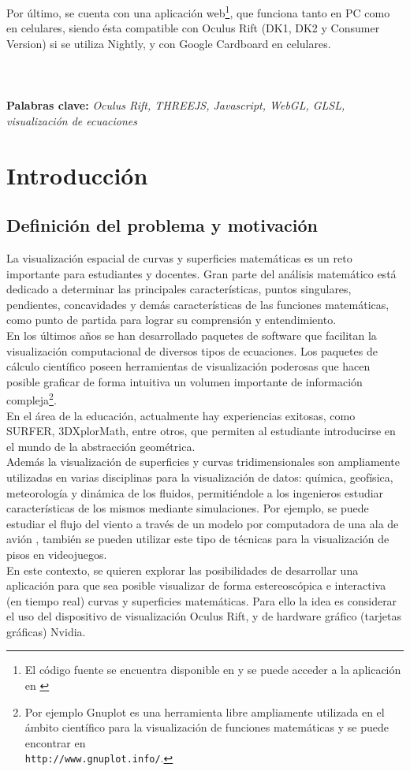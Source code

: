 \documentclass[12pt]{article}
\begin{document}
Por último, se cuenta con una aplicación web\footnote{El código fuente se encuentra disponible en \cite{nuestrocodigo} y se puede acceder a la aplicación en \cite{nuestrositio}}, que funciona  tanto en PC como en celulares, siendo ésta compatible con Oculus Rift (DK1, DK2 y Consumer Version) si se utiliza Nightly, y con Google Cardboard en celulares.
\\
\\
\\
\\
\textbf{Palabras clave:} \textit{Oculus Rift, THREEJS, Javascript, WebGL, GLSL, visualización de ecuaciones} 


\clearpage
\tableofcontents
\clearpage
\section{Introducción}

\subsection{Definición del problema y motivación}
La visualización espacial de curvas y superficies matemáticas es un reto importante para estudiantes y docentes. Gran parte del análisis matemático está dedicado a determinar las principales características, puntos singulares, pendientes, concavidades y demás características de las  funciones matemáticas, como punto de partida para lograr su comprensión y entendimiento.
\\En los últimos años se han desarrollado paquetes de software que facilitan la visualización computacional de diversos tipos de ecuaciones. Los paquetes de cálculo científico poseen herramientas de visualización poderosas que hacen posible graficar de forma intuitiva un volumen importante de información compleja\footnote{Por ejemplo Gnuplot es una herramienta libre ampliamente utilizada en el ámbito científico para la visualización de funciones matemáticas y se puede encontrar en \\\texttt{http://www.gnuplot.info/}\cite{gnuplot}.}.  
\\En el área de la educación, actualmente hay experiencias exitosas, como SURFER\cite{surfer}, 3DXplorMath\cite{dxplormath}, entre otros, que permiten al estudiante introducirse en el mundo de la abstracción geométrica. 
\\Además la visualización de superficies y curvas tridimensionales son ampliamente utilizadas en varias disciplinas para la visualización de datos: química, geofísica, meteorología y dinámica de los fluidos, permitiéndole a los ingenieros estudiar características de los mismos mediante simulaciones. Por ejemplo, se puede estudiar el flujo del viento a través de un modelo por computadora de una ala de avión \cite{aircraftwing}, también se pueden utilizar este tipo de técnicas para la visualización de pisos en videojuegos\cite{realtimerendering}\cite{engine}.
\\En este contexto, se quieren explorar las posibilidades de desarrollar una aplicación para que sea posible visualizar de forma estereoscópica e interactiva (en tiempo real) curvas y superficies matemáticas. Para ello la idea es considerar el uso del dispositivo de visualización Oculus Rift, y de hardware gráfico (tarjetas gráficas) Nvidia.
\end{document}
